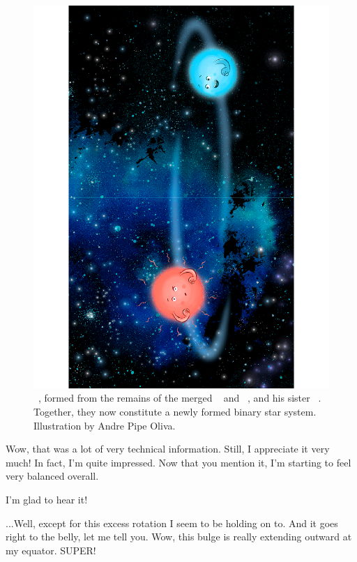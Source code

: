 \documentclass[main.tex]{subfiles}
\begin{document}
\begin{figure}
\includegraphics[width=\columnwidth,angle=270,origin=c]{ch3_3.pdf}
\caption{\rmlacedaemon~, formed from the remains of the merged \rmtaygete~ and \rmalcyone~, and his sister \rmcelaeno~.  Together, they now constitute a newly formed binary star system.  Illustration by Andre Pipe Oliva.
\label{fig:fig1}}
\end{figure}

\par \Lacedaemon Wow, that was a lot of very technical information.  Still, I appreciate it very much!  In fact, I'm quite impressed.  Now that you mention it, I'm starting to feel very balanced overall.  

\par \Celaeno I'm glad to hear it!

\par \Lacedaemon ...Well, except for this excess rotation I seem to be holding on to. And it goes right to the belly, let me tell you.  Wow, this bulge is really extending outward at my equator.  SUPER!  
\end{document}
